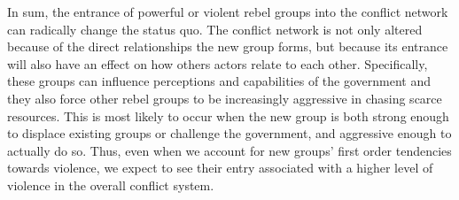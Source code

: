 In sum, the entrance of powerful or violent rebel groups into the conflict network can radically change the status quo. The conflict network is not only altered because of the direct relationships the new group forms, but because its entrance will also have an effect on how others actors relate to each other. Specifically, these groups can influence perceptions and capabilities of the government and they also force other rebel groups to be increasingly aggressive in chasing scarce resources. This is most likely to occur when the new group is both strong enough to displace existing groups or challenge the government, and aggressive enough to actually do so. Thus, even when we account for new groups' first order tendencies towards violence, we expect to see their entry associated with a higher level of violence in the overall conflict system.
